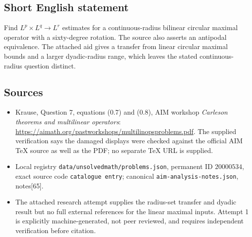 \documentclass[11pt]{article}
\begin{document}
\subsection{Short English statement}
Find \(L^p\times L^q\to L^r\) estimates for a continuous-radius bilinear circular maximal operator with a sixty-degree rotation. The source also asserts an antipodal equivalence. The attached aid gives a transfer from linear circular maximal bounds and a larger dyadic-radius range, which leaves the stated continuous-radius question distinct.
\subsection{Sources}
\begin{itemize}
\item Krause, Question 7, equations (0.7) and (0.8), AIM workshop \emph{Carleson theorems and multilinear operators}: \url{https://aimath.org/pastworkshops/multilinopsproblems.pdf}. The supplied verification says the damaged displays were checked against the official AIM TeX source as well as the PDF; no separate TeX URL is supplied.
\item Local registry \texttt{data/unsolvedmath/problems.json}, permanent ID \(20000534\), exact source code \texttt{catalogue entry}; canonical \texttt{aim-analysis-notes.json}, notes[65].
\item The attached research attempt supplies the radius-set transfer and dyadic result but no full external references for the linear maximal inputs. Attempt 1 is explicitly machine-generated, not peer reviewed, and requires independent verification before citation.
\end{itemize}
\end{document}
